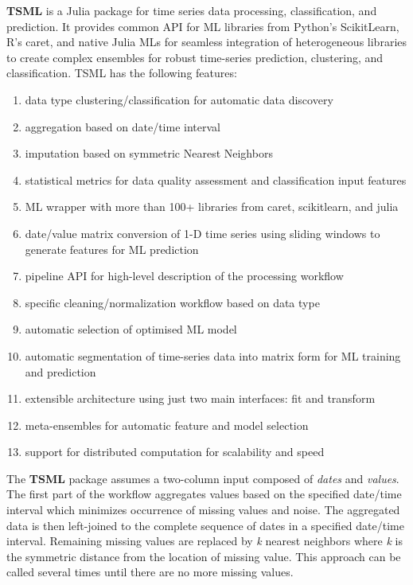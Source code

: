 \documentclass{juliacon}
\begin{document}
\textbf{TSML} is a Julia\cite{bezanson2017julia} package for time series data processing, classification, and prediction. 
It provides common API for ML libraries from Python's ScikitLearn, 
R's caret, and native Julia MLs for seamless integration of heterogeneous 
libraries to create complex ensembles for robust time-series prediction, clustering, and classification.
TSML has the following features:
\begin{enumerate}
\item data type clustering/classification for automatic data discovery
\item aggregation based on date/time interval
\item imputation based on symmetric Nearest Neighbors
\item statistical metrics for data quality assessment and classification input features
\item ML wrapper with more than 100+ libraries from caret, scikitlearn, and julia
\item date/value matrix conversion of 1-D time series using sliding windows to generate features for ML prediction
\item pipeline API for high-level description of the processing workflow
\item specific cleaning/normalization workflow based on data type
\item automatic selection of optimised ML model
\item automatic segmentation of time-series data into matrix form for ML training and prediction 
\item extensible architecture using just two main interfaces: fit and transform
\item meta-ensembles for automatic feature and model selection
\item support for distributed computation for scalability and speed
\end{enumerate}

The \textbf{TSML} package assumes a two-column input composed of \emph{dates} and \emph{values}. 
The first part of the workflow aggregates values based on the specified date/time 
interval which minimizes occurrence of missing values and noise. The aggregated 
data is then left-joined to the complete sequence of dates in a specified date/time interval. 
Remaining missing values are replaced by \textit{k} nearest neighbors where \textit{k} is the symmetric 
distance from the location of missing value. This approach can be called several 
times until there are no more missing values.
\end{document}
